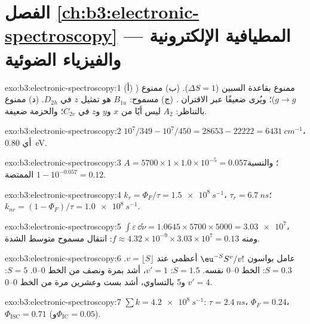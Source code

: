 \section*{الفصل \ref{ch:b3:electronic-spectroscopy} --- المطيافية الإلكترونية والفيزياء الضوئية}

\begin{solution}{exo:b3:electronic-spectroscopy:1}
(أ) ممنوع بقاعدة السبين ($\Delta S = 1$). (ب) ممنوع 
($g \to g$)؛ ويُرى ضعيفًا عبر الاقتران . (ج) مسموح: $B_{1u}$ هو
تمثيل $z$ في $D_{2h}$. (د) ممنوع بالتناظر: $A_2$ ليس أيًا من $x$
و$y$ و$z$ في $C_{2v}$؛ والحزمة ضعيفة.
\end{solution}

\begin{solution}{exo:b3:electronic-spectroscopy:2}
$10^7/349 - 10^7/450 = 28653 - 22222 = \qty{6431}{cm^{-1}}$، أي \qty{0.80}{eV}.
\end{solution}

\begin{solution}{exo:b3:electronic-spectroscopy:3}
$A = 5700 \times 1 \times 1.0\times10^{-5} = 0.057$؛ والنسبة الممتصة $1 - 10^{-0.057} =
0.12$.
\end{solution}

\begin{solution}{exo:b3:electronic-spectroscopy:4}
$k_r = \Phi_F/\tau = \qty{1.5e8}{s^{-1}}$، $\tau_r = \qty{6.7}{ns}$؛ $k_{nr} = (1 - \Phi_F)/\tau
= \qty{1.0e8}{s^{-1}}$.
\end{solution}

\begin{solution}{exo:b3:electronic-spectroscopy:5}
$\int\varepsilon\,\dd\tilde\nu = 1.0645 \times 5700 \times 5000 = \num{3.03e7}$، ومنه $f \approx
4.32\times10^{-9} \times 3.03\times10^7 = 0.13$: انتقال مسموح متوسط
الشدة.
\end{solution}

\begin{solution}{exo:b3:electronic-spectroscopy:6}
عامل بواسون $\eu^{-S}S^v/v!$ أعظمي عند $v = \lfloor S\rfloor$. $S = 0.3$: الخط
0--0 نفسه. $S = 1.5$: $v' = 1$، أشد بمرة ونصف من الخط 0--0. $S = 5$: $v' = 4$
و5 بالتساوي، أشد بست وعشرين مرة من الخط 0--0.
\end{solution}

\begin{solution}{exo:b3:electronic-spectroscopy:7}
$\sum k = \qty{4.2e8}{s^{-1}}$: $\tau = \qty{2.4}{ns}$، $\Phi_F = 0.24$، $\Phi_{\mathrm{ISC}} = 0.71$
(و$\Phi_{\mathrm{IC}} = 0.05$).
\end{solution}

